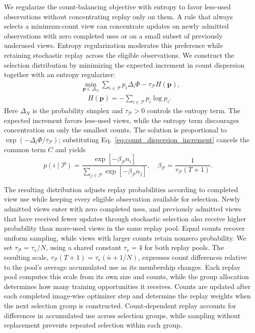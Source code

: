 We regularize the count-balancing objective with entropy to favor less-used observations without concentrating replay only on them.
A rule that always selects a minimum-count view can concentrate updates on newly admitted observations with zero completed uses or on a small subset of previously underused views.
Entropy regularization moderates this preference while retaining stochastic replay across the eligible observations.
We construct the selection distribution by minimizing the expected increment in count dispersion together with an entropy regularizer:
\begin{equation}
  \begin{aligned}
  &\min_{\mathbf p\in\Delta_N}
     \sum_{i\in\mathcal P}p_i\Delta_i\Phi-\tau_{\mathcal P}H(\mathbf p),\\
  &\hspace{1em}H(\mathbf p)=-\sum_{i\in\mathcal P}p_i\log p_i.
  \end{aligned}
  \label{eq:entropy_sampling_objective}
\end{equation}
Here $\Delta_N$ is the probability simplex and $\tau_{\mathcal P}>0$ controls the entropy term.
The expected increment favors less-used views, while the entropy term discourages concentration on only the smallest counts.
The solution is proportional to $\exp(-\Delta_i\Phi/\tau_{\mathcal P})$; substituting Eq.~\eqref{eq:count_dispersion_increment} cancels the common term $C$ and yields
\begin{equation}
  p(i\mid\mathcal P)
  =\frac{\exp[-\beta_{\mathcal P}n_i]}
         {\sum_{j\in\mathcal P}\exp[-\beta_{\mathcal P}n_j]},
  \quad
  \beta_{\mathcal P}=\frac{1}{\tau_{\mathcal P}(T+1)}.
  \label{eq:entropy_view_sampling}
\end{equation}

The resulting distribution adjusts replay probabilities according to completed view use while keeping every eligible observation available for selection.
Newly admitted views enter with zero completed uses, and previously admitted views that have received fewer updates through stochastic selection also receive higher probability than more-used views in the same replay pool.
Equal counts recover uniform sampling, while views with larger counts retain nonzero probability.
We set $\tau_{\mathcal P}=\tau_{\mathrm v}/N$, using a shared constant $\tau_{\mathrm v}=4$ for both replay pools.
The resulting scale, $\tau_{\mathcal P}(T+1)=\tau_{\mathrm v}(\bar n+1/N)$, expresses count differences relative to the pool's average accumulated use as its membership changes.
Each replay pool computes this scale from its own size and counts, while the group allocation determines how many training opportunities it receives.
Counts are updated after each completed image-wise optimizer step and determine the replay weights when the next selection group is constructed.
Count-dependent replay accounts for differences in accumulated use across selection groups, while sampling without replacement prevents repeated selection within each group.

